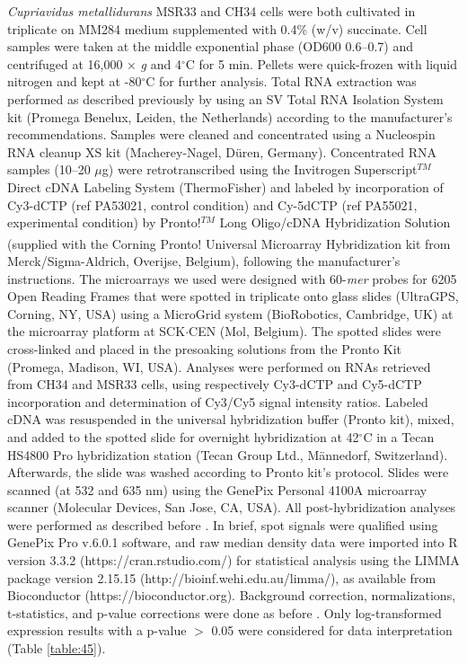 \textit{Cupriavidus metallidurans} MSR33 and CH34 cells were both cultivated in triplicate on MM284 medium supplemented with 0.4\% (w/v) succinate. Cell samples were taken at the middle exponential phase (OD600 0.6–0.7) and centrifuged at 16,000 × \textit{g} and 4$^{\circ}$C for 5 min. Pellets were quick-frozen with liquid nitrogen and kept at -80$^{\circ}$C for further analysis. Total RNA extraction was performed as described previously \citep{monsieurs2011heavy} by using an SV Total RNA Isolation System kit (Promega Benelux, Leiden, the Netherlands) according to the manufacturer’s recommendations. Samples were cleaned and concentrated using a Nucleospin RNA cleanup XS kit (Macherey-Nagel, Düren, Germany). Concentrated RNA samples (10–20 $\mu$g) were retrotranscribed using the Invitrogen Superscript$^{TM}$ Direct cDNA Labeling System (ThermoFisher) and labeled by incorporation of Cy3-dCTP (ref PA53021, control condition) and Cy-5dCTP (ref PA55021, experimental condition) by Pronto!$^{TM}$ Long Oligo/cDNA Hybridization Solution (supplied with the Corning\textsuperscript{\tiny\textregistered} Pronto! Universal Microarray Hybridization kit from Merck/Sigma-Aldrich, Overijse, Belgium), following the manufacturer’s instructions. The microarrays we used were designed with 60-\textit{mer} probes for 6205 Open Reading Frames that were spotted in triplicate onto glass slides (UltraGPS, Corning, NY, USA) using a MicroGrid system (BioRobotics, Cambridge, UK) at the microarray platform at SCK$\cdot$CEN (Mol, Belgium). The spotted slides were cross-linked and placed in the presoaking solutions from the Pronto Kit (Promega, Madison, WI, USA). Analyses were performed on RNAs retrieved from CH34 and MSR33 cells, using respectively Cy3-dCTP and Cy5-dCTP incorporation and determination of Cy3/Cy5 signal intensity ratios. Labeled cDNA was resuspended in the universal hybridization buffer (Pronto kit), mixed, and added to the spotted slide for overnight hybridization at 42$^{\circ}$C in a Tecan HS4800 Pro hybridization station (Tecan Group Ltd., Männedorf, Switzerland). Afterwards, the slide was washed according to Pronto kit’s protocol. Slides were scanned (at 532 and 635 nm) using the GenePix Personal 4100A microarray scanner (Molecular Devices, San Jose, CA, USA). All post-hybridization analyses were performed as described before \citep{monsieurs2011heavy}. In brief, spot signals were qualified using GenePix Pro v.6.0.1 software, and raw median density data were imported into R version 3.3.2 (https://cran.rstudio.com/) for statistical analysis using the LIMMA package version 2.15.15 (http://bioinf.wehi.edu.au/limma/), as available from Bioconductor (https://bioconductor.org). Background correction, normalizations, t-statistics, and p-value corrections were done as before \citep{monsieurs2011heavy}. Only log-transformed expression results with a p-value $>$ 0.05 were considered for data interpretation (Table \ref{table:45}).

